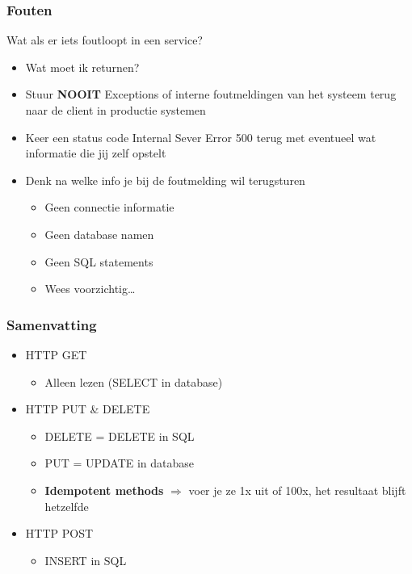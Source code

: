 \documentclass{article}
\newcommand{\bold}[1]{\textbf{#1}}
\begin{document}
\subsubsection{Fouten}
Wat als er iets foutloopt in een service?

\begin{itemize}
    \item Wat moet ik returnen?
    \item Stuur \bold{NOOIT} Exceptions of interne foutmeldingen van het systeem terug naar de client in productie systemen
    \item Keer een status code Internal Sever Error 500 terug met eventueel wat informatie die jij zelf opstelt
    \item Denk na welke info je bij de foutmelding wil terugsturen
    \begin{itemize}
        \item Geen connectie informatie
        \item Geen database namen
        \item Geen SQL statements
        \item Wees voorzichtig\dots
    \end{itemize}
\end{itemize}

\subsubsection{Samenvatting}
\begin{itemize}
    \item HTTP GET
    \begin{itemize}
        \item Alleen lezen (SELECT in database)
    \end{itemize}
    \item HTTP PUT \& DELETE
    \begin{itemize}
        \item DELETE = DELETE in SQL
        \item PUT = UPDATE in database
        \item \bold{Idempotent methods} $\Rightarrow$ voer je ze 1x uit of 100x, het resultaat blijft hetzelfde
    \end{itemize}
    \item HTTP POST
    \begin{itemize}
        \item INSERT in SQL
    \end{itemize}
\end{itemize}
\end{document}
